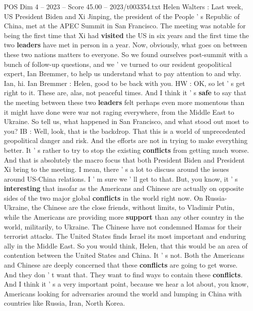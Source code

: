 \begin{textsample}{POS Dim 4 – 2023 – Score 45.00 – 2023/t003354.txt}  \label{ex:f4_pos_030}
Helen Walters : Last week, US President Biden and Xi Jinping, the president of the People ' s Republic of China, met at the APEC Summit in San Francisco.
The meeting was notable for being the first time that Xi had \textbf{visited} the US in six years and the first time the two \textbf{leaders} have met in person in a year.
Now, obviously, what goes on between these two nations matters to everyone.
So we found ourselves post-summit with a bunch of follow-up questions, and we ' ve turned to our resident geopolitical expert, Ian Bremmer, to help us understand what to pay attention to and why.
Ian, hi.
Ian Bremmer : Helen, good to be back with you.
HW : OK, so let ' s get right to it.
These are, alas, not peaceful times.
And I think it ' s \textbf{safe} to say that the meeting between these two \textbf{leaders} felt perhaps even more momentous than it might have done were war not raging everywhere, from the Middle East to Ukraine.
So tell us, what happened in San Francisco, and what stood out most to you?
IB : Well, look, that is the backdrop.
That this is a world of unprecedented geopolitical danger and risk.
And the efforts are not in trying to make everything better.
It ' s rather to try to stop the existing \textbf{conflicts} from getting much worse.
And that is absolutely the macro focus that both President Biden and President Xi bring to the meeting.
I mean, there ' s a lot to discuss around the issues around US-China relations.
I ' m sure we ' ll get to that.
But, you know, it ' s \textbf{interesting} that insofar as the Americans and Chinese are actually on opposite sides of the two major global \textbf{conflicts} in the world right now.
On Russia-Ukraine, the Chinese are the close friends, without limits, to Vladimir Putin, while the Americans are providing more \textbf{support} than any other country in the world, militarily, to Ukraine.
The Chinese have not condemned Hamas for their terrorist attacks.
The United States finds Israel its most important and enduring ally in the Middle East.
So you would think, Helen, that this would be an area of contention between the United States and China.
It ' s not.
Both the Americans and Chinese are deeply concerned that these \textbf{conflicts} are going to get worse.
And they don ' t want that.
They want to find ways to contain these \textbf{conflicts}.
And I think it ' s a very important point, because we hear a lot about, you know, Americans looking for adversaries around the world and lumping in China with countries like Russia, Iran, North Korea.

\end{textsample}
